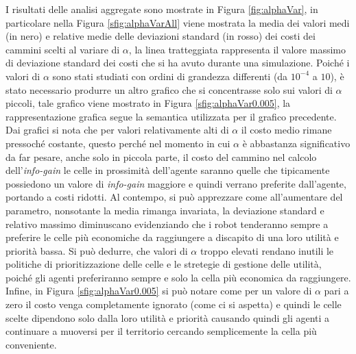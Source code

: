 I risultati delle analisi aggregate sono mostrate in Figura \ref{fig:alphaVar}, in particolare nella Figura \ref{sfig:alphaVarAll} viene mostrata la media dei valori medi (in nero) e relative medie delle deviazioni standard (in rosso) dei costi dei cammini scelti al variare di $\alpha$, la linea tratteggiata rappresenta il valore massimo di deviazione standard dei costi che si ha avuto durante una simulazione.
Poiché i valori di $\alpha$ sono stati studiati con ordini di grandezza differenti (da $10^{-4}$ a $10$), è stato necessario produrre un altro grafico che si concentrasse solo sui valori di $\alpha$ piccoli, tale grafico viene mostrato in Figura \ref{sfig:alphaVar0.005}, la rappresentazione grafica segue la semantica utilizzata per il grafico precedente.
Dai grafici si nota che per valori relativamente alti di $\alpha$ il costo medio rimane pressoché costante, questo perché nel momento in cui $\alpha$ è abbastanza significativo da far pesare, anche solo in piccola parte, il costo del cammino nel calcolo dell'\textit{info-gain} le celle in prossimità dell'agente saranno quelle che tipicamente possiedono un valore di \textit{info-gain} maggiore e quindi verrano preferite dall'agente, portando a costi ridotti.
Al contempo, si può apprezzare come all'aumentare del parametro, nonsotante la media rimanga invariata, la deviazione standard e relativo massimo diminuscano evidenziando che i robot tenderanno sempre a preferire le celle più economiche da raggiungere a discapito di una loro utilità e priorità bassa.
Si può dedurre, che valori di $\alpha$ troppo elevati rendano inutili le politiche di prioritizzazione delle celle e le stretegie di gestione delle utilità, poiché gli agenti preferiranno sempre e solo la cella più economica da raggiungere.
Infine, in Figura \ref{sfig:alphaVar0.005} si può notare come per un valore di $\alpha$ pari a zero il costo venga completamente ignorato (come ci si aspetta) e quindi le celle scelte dipendono solo dalla loro utilità e priorità causando quindi gli agenti a continuare a muoversi per il territorio cercando semplicemente la cella più conveniente. 
